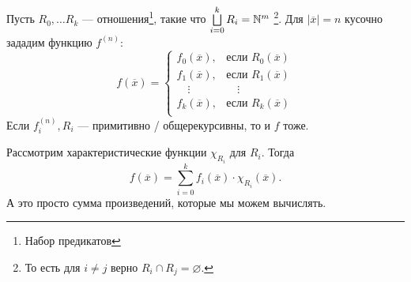 \begin{thm}
	Пусть $ R_0, \ldots R_k $ --- отношения\footnote{Набор предикатов}, такие что $ \bigsqcup\limits_{i=0}^{k} R_i = \mathbb{N}^{m}$
	\footnote{То есть для $ i \ne  j$ верно $ R_{i} \cap R_j = \varnothing$.}.
	Для $ \lvert \overline{x} \rvert = n$ кусочно зададим функцию $ f^{(n)}$:
\[
	f(\overline{x}) = \begin{cases}
		f_0(\overline{x}), & \text{если }R_0(\overline{x}) \\
		f_1(\overline{x}), &  \text{если }R_1(\overline{x}) \\
		\quad\vdots & \quad\vdots \\
		f_k(\overline{x}), &  \text{если }R_k(\overline{x}) \\
	\end{cases}
\] 
Если $ f_i^{(n)}, R_i$ --- примитивно / общерекурсивны, то и $ f$ тоже.
\end{thm}
\begin{proof*}
	Рассмотрим характеристические функции $ \chi_{R_{i}} $ для $ R_i$.
	Тогда 
	\[
		f(\overline{x}) = \sum_{i=0}^{k} f_i(\overline{x}) \cdot \chi_{R_{i}}(\overline{x})
	.\] 
	А это просто сумма произведений, которые мы можем вычислять.
\end{proof*}


